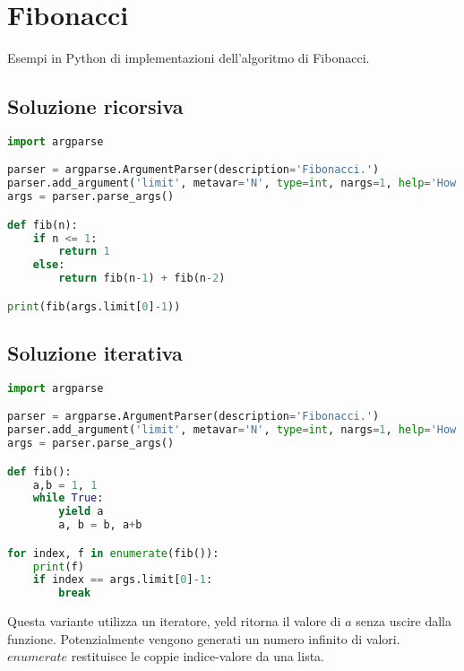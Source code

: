\section{Fibonacci}

Esempi in Python di implementazioni dell'algoritmo di Fibonacci.
\subsection{Soluzione ricorsiva}

\begin{lstlisting}[language=Python]
import argparse

parser = argparse.ArgumentParser(description='Fibonacci.')
parser.add_argument('limit', metavar='N', type=int, nargs=1, help='How many Fibonacci numbers to compute')
args = parser.parse_args()

def fib(n):
    if n <= 1:
        return 1
    else:
        return fib(n-1) + fib(n-2)

print(fib(args.limit[0]-1))
\end{lstlisting}

\subsection{Soluzione iterativa}

\begin{lstlisting}[language=Python]
import argparse

parser = argparse.ArgumentParser(description='Fibonacci.')
parser.add_argument('limit', metavar='N', type=int, nargs=1, help='How many Fibonacci numbers to compute')
args = parser.parse_args()

def fib():
    a,b = 1, 1
    while True:
        yield a
        a, b = b, a+b

for index, f in enumerate(fib()):
    print(f)
    if index == args.limit[0]-1:
        break
\end{lstlisting}
Questa variante utilizza un iteratore, yeld ritorna il valore di $a$ senza uscire dalla funzione. Potenzialmente vengono generati un numero infinito di valori. $enumerate$ restituisce le coppie indice-valore da una lista.